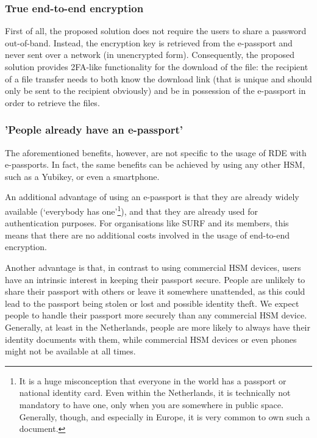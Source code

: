 \subsubsection{True end-to-end encryption}\label{subsubsec:true-end-to-end-encryption}
First of all, the proposed solution does not require the users to share a password out-of-band.
Instead, the encryption key is retrieved from the e-passport and never sent over a network (in unencrypted form).
Consequently, the proposed solution provides 2FA-like functionality for the download of the file: the recipient of a file transfer needs to both know the download link (that is unique and should only be sent to the recipient obviously) and be in possession of the e-passport in order to retrieve the files.

\subsubsection{'People already have an e-passport'}\label{subsubsec:people-already-have-an-e-passport}
The aforementioned benefits, however, are not specific to the usage of RDE with e-passports.
In fact, the same benefits can be achieved by using any other HSM, such as a Yubikey, or even a smartphone.

An additional advantage of using an e-passport is that they are already widely available (`everybody has one'\footnote{
    It is a huge misconception that everyone in the world has a passport or national identity card.
    Even within the Netherlands, it is technically not mandatory to have one, only when you are somewhere in public space.
    Generally, though, and especially in Europe, it is very common to own such a document.
}), and that they are already used for authentication purposes.
For organisations like SURF and its members, this means that there are no additional costs involved in the usage of end-to-end encryption.

Another advantage is that, in contrast to using commercial HSM devices, users have an intrinsic interest in keeping their passport secure.
People are unlikely to share their passport with others or leave it somewhere unattended, as this could lead to the passport being stolen or lost and possible identity theft.
We expect people to handle their passport more securely than any commercial HSM device.
Generally, at least in the Netherlands, people are more likely to always have their identity documents with them, while commercial HSM devices or even phones might not be available at all times.

